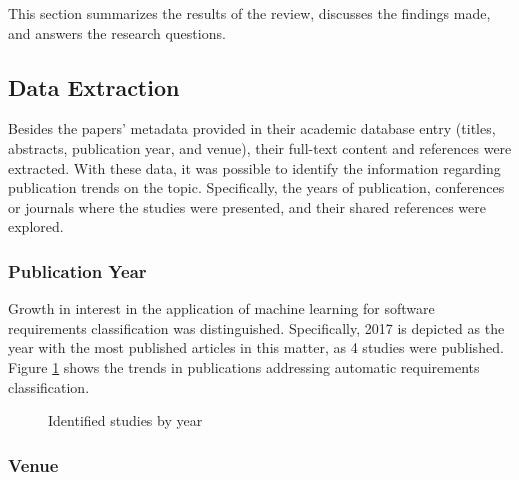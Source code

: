 \documentclass[conference]{IEEEtran}
\begin{document}
This section summarizes the results of the review, discusses the findings made, and answers the research questions.

\subsection{Data Extraction}

Besides the papers' metadata provided in their academic database entry (titles, abstracts, publication year, and venue), their full-text content and references were extracted. With these data, it was possible to identify the information regarding publication trends on the topic. Specifically, the years of publication, conferences or journals where the studies were presented, and their shared references were explored.

\subsubsection{Publication Year}

Growth in interest in the application of machine learning for software requirements classification was distinguished. Specifically, 2017 is depicted as the year with the most published articles in this matter, as 4 studies were published. Figure \ref{fig:publication_years} shows the trends in publications addressing automatic requirements classification.

\begin{figure}[!htbp]
    \caption{\label{fig:publication_years}Identified studies by year}
\end{figure}

\subsubsection{Venue}
\end{document}
